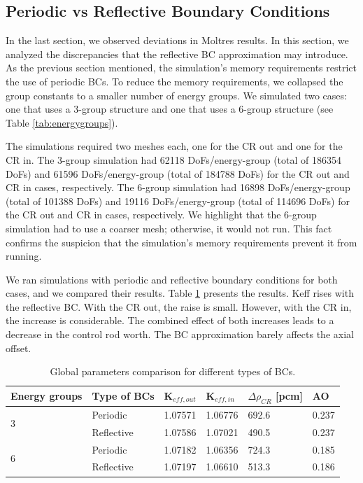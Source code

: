 \documentclass[11pt,letterpaper]{article}
\begin{document}
\subsection{Periodic vs Reflective Boundary Conditions}
\label{sec:bench-bcs}

In the last section, we observed deviations in Moltres results.
In this section, we analyzed the discrepancies that the reflective \gls{BC} approximation may introduce.
As the previous section mentioned, the simulation's memory requirements restrict the use of periodic BCs.
To reduce the memory requirements, we collapsed the group constants to a smaller number of energy groups.
We simulated two cases: one that uses a 3-group structure and one that uses a 6-group structure (see Table \ref{tab:energygroups}).

The simulations required two meshes each, one for the CR out and one for the CR in.
The 3-group simulation had 62118 DoFs/energy-group (total of 186354 DoFs) and 61596 DoFs/energy-group (total of 184788 DoFs) for the CR out and CR in cases, respectively.
The 6-group simulation had 16898 DoFs/energy-group (total of 101388 DoFs) and 19116 DoFs/energy-group (total of 114696 DoFs) for the CR out and CR in cases, respectively.
We highlight that the 6-group simulation had to use a coarser mesh; otherwise, it would not run.
This fact confirms the suspicion that the simulation's memory requirements prevent it from running.

We ran simulations with periodic and reflective boundary conditions for both cases, and we compared their results.
Table \ref{tab:benchmark-bc} presents the results.
Keff rises with the reflective BC.
With the CR out, the raise is small.
However, with the CR in, the increase is considerable.
The combined effect of both increases leads to a decrease in the control rod worth.
The BC approximation barely affects the axial offset.

\begin{table}[htbp!]
  \centering
  \caption{Global parameters comparison for different types of BCs.}
  \begin{tabular}{l|l|l|l|l|l}
  \toprule
  Energy groups       & Type of BCs & K$_{eff, out}$ & K$_{eff, in}$ & $\Delta \rho_{CR}$ [pcm] & AO \\
  \midrule
  \multirow{2}{*}{3}  & Periodic     & 1.07571		& 1.06776		& 692.6		& 0.237		\\
                      & Reflective   & 1.07586	  & 1.07021   & 490.5		& 0.237	  \\ \hline
  \multirow{2}{*}{6}  & Periodic     & 1.07182		& 1.06356		& 724.3	  & 0.185  	\\
                      & Reflective   & 1.07197   	& 1.06610 	& 513.3		& 0.186		\\  
  \bottomrule
  \end{tabular}
  \label{tab:benchmark-bc}
\end{table}
\end{document}
